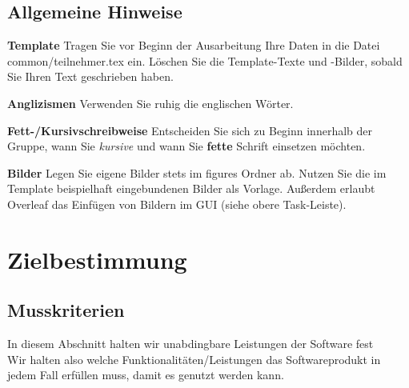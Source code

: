 \section{Allgemeine Hinweise}
\textbf{Template} Tragen Sie vor Beginn der Ausarbeitung Ihre Daten in die Datei common/teilnehmer.tex ein. Löschen Sie die Template-Texte und -Bilder, sobald Sie Ihren Text geschrieben haben.

\textbf{Anglizismen} Verwenden Sie ruhig die englischen Wörter.

\textbf{Fett-/Kursivschreibweise} Entscheiden Sie sich zu Beginn innerhalb der Gruppe, wann Sie \textit{kursive} und wann Sie \textbf{fette} Schrift einsetzen möchten.

\textbf{Bilder} Legen Sie eigene Bilder stets im figures Ordner ab. Nutzen Sie die im Template beispielhaft eingebundenen Bilder als Vorlage. Außerdem erlaubt Overleaf das Einfügen von Bildern im GUI (siehe obere Task-Leiste).


\chapter{Zielbestimmung}
\label{chap:target}
\iffalse
Dieser Abschnitt hat die Aufgabe, als eine Art Einleitung zu dienen. Es soll
ein kurzer Umriss über Ziel und Motivation des Gesamt- und ggf. der
Teilprojekte dargestellt werden. Beschrieben wird die Hauptaufgabe des Systems.
Wichtig ist, den Grund für die Systementwicklung (Probleme oder Geschäftsidee)
und damit ihre Ziele herauszuarbeiten.
\fi

\section{Musskriterien}\label{sec:musskriterien}
In diesem Abschnitt halten wir unabdingbare Leistungen der Software fest\\
Wir halten also welche Funktionalitäten/Leistungen das Softwareprodukt in
jedem Fall erfüllen muss, damit es genutzt werden kann.



